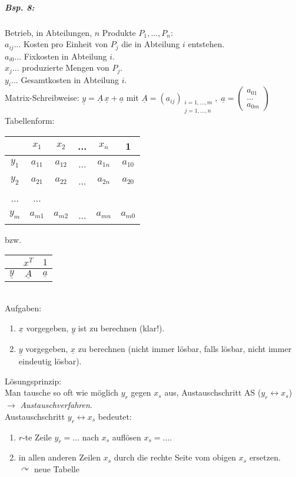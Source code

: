 \subparagraph{Bsp. 8:}\parskp
Betrieb, in Abteilungen, $n$ Produkte $P_1,...,P_n$:\\
$a_{ij}$... Kosten pro Einheit von $P_j$ die in Abteilung $i$ entstehen.\\
$a_{i0}$... Fixkosten in Abteilung $i$.\\
$x_{j}$... produzierte Mengen von $P_j$.\\
$y_{i}$... Gesamtkosten in Abteilung $i$.\medskip\\
Matrix-Schreibweise: $\underline{y}=\underline{A}\,\underline{x}+\underline{a}$ mit $\underline{A}=(a_{ij})_{\substack{i=1,...,m\\j=1,...,n}},\; \underline{a}=\begin{pmatrix}
a_{01}\\
...\\
a_{0m}
\end{pmatrix}$\\
Tabellenform:\\
\begin{tabular}{c | c c c c c}
& $x_1$ & $x_2$ & ... & $x_n$ & 1\\
\hline
$y_1$ & $a_{11}$ & $a_{12}$ & ... & $a_{1n}$ & $a_{10}$\\
$y_2$ & $a_{21}$ & $a_{22}$ & ... & $a_{2n}$ & $a_{20}$\\
... & ... & & & & \\
$y_m$ & $a_{m1}$ & $a_{m2}$ & ... & $a_{mn}$ & $a_{m0}$\\
\end{tabular} bzw. 
\begin{tabular}{c | c c}
& $x^T$ & $1$\\
\hline
$\underline{y}$ & $\underline{A}$ & $\underline{a}$\\
\end{tabular}\\
Aufgaben:
\begin{enumerate}
\item $\underline{x}$ vorgegeben, $\underline{y}$ ist zu berechnen (klar!).
\item $\underline{y}$ vorgegeben, $\underline{x}$ zu berechnen (nicht immer lösbar, falls lösbar, nicht immer eindeutig lösbar).
\end{enumerate}
Lösungsprinzip:\\
Man tausche so oft wie möglich $y_r$ gegen $x_s$ aus, Austauschschritt AS ($y_r\leftrightarrow x_s$) $\rightarrow$ \emph{Austauschverfahren}.\\
Austauschschritt $y_r\leftrightarrow x_s$ bedeutet:
\begin{enumerate}
\item $r$-te Zeile $y_r=...$ nach $x_s$ auflösen $x_s=...$.
\item in allen anderen Zeilen $x_s$ durch die rechte Seite vom obigen $x_s$ ersetzen.\\
$\curvearrowright$ neue Tabelle
\end{enumerate}
